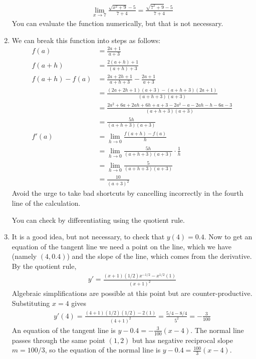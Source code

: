 \documentclass{article}
\newcommand{\ds}{\displaystyle}
\begin{document}
\begin{enumerate}
  \begin{align*}
    \lim_{x\to 7} \frac{\sqrt{x^2+9}-5}{7+4}
    = \frac{\sqrt{7^2+9}-5}{7+4}
  \end{align*}
  You can evaluate the function numerically, but that is not necessary.
\item We can break this function into steps as follows:
  \begin{align*}
    f(a) &= \frac{2a+1}{a+3} \\
    f(a+h) &= \frac{2(a+h)+1}{(a+h)+3} \\
    f(a+h)-f(a) &= \frac{2a+2h+1}{a+h+3} - \frac{2a+1}{a+3}
    \\
    &= \frac{(2a+2h+1)(a+3)-(a+h+3)(2a+1)}{(a+h+3)(a+3)}
    \\
    &= \frac{2a^2+6a+2ah+6h+a+3-2a^2-a-2ah-h-6a-3}{(a+h+3)(a+3)}
    \\
    &= \frac{5h}{(a+h+3)(a+3)}
    \\
    f'(a) &= \lim_{h\to 0} \frac{f(a+h)-f(a)}{h}
    \\
    &= \lim_{h\to 0} \frac{5h}{(a+h+3)(a+3)} \cdot \frac{1}{h}
    \\
    &= \lim_{h\to 0} \frac{5}{(a+h+3)(a+3)}
    \\
    &= \frac{10}{(a+3)^2}
  \end{align*}
  Avoid the urge to take bad shortcuts by cancelling incorrectly in the 
  fourth line of the calculation.

  You can check by differentiating using the quotient rule.
\item It is a good idea, but not necessary, to check that $y(4)=0.4$.  Now
  to get an equation of the tangent line we need a point on the line, which
  we have (namely $(4,0.4)$) and the slope of the line, which comes from
  the derivative.  By the quotient rule,
  \begin{align*}
    y' = \frac{(x+1)(1/2)x^{-1/2} - x^{1/2}(1)}{(x+1)^2}
  \end{align*}
  Algebraic simplifications are possible at this point
  but are counter-productive.  Substituting $x=4$ gives
  \begin{align*}
    y'(4) = \frac{(4+1)(1/2)(1/2) - 2(1)}{(4+1)^2}
    = \frac{5/4-8/4}{5^2} = -\frac{3}{100}
  \end{align*}
  An equation of the tangent line is $\ds y-0.4=-\frac{3}{100} (x-4)$.
  The normal line passes through the same point $(1,2)$ but has negative
  reciprocal slope $m=100/3$, so the equation of the normal line is
  $y-0.4=\frac{100}{3}(x-4)$.


\end{enumerate}
\end{document}
